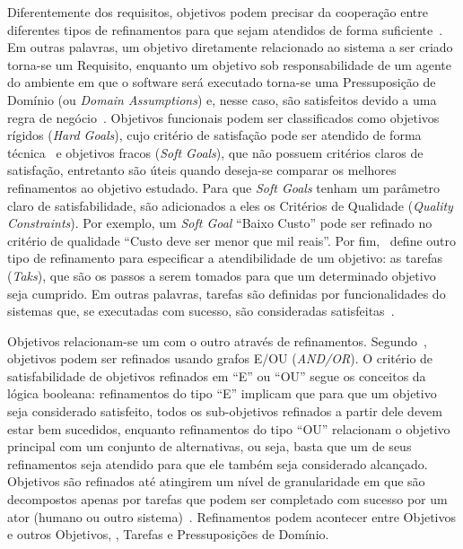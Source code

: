 Diferentemente dos requisitos, objetivos podem precisar da cooperação entre diferentes tipos de refinamentos para que sejam atendidos de forma suficiente~\cite{dardenne1993goal}. Em outras palavras, um objetivo diretamente relacionado ao sistema a ser criado torna-se um Requisito, enquanto um objetivo sob responsabilidade de um agente do ambiente em que o software será executado torna-se uma Pressuposição de Domínio (ou \textit{Domain Assumptions}) e, nesse caso, são satisfeitos devido a uma regra de negócio~\cite{van2001goal, van1998managing}. Objetivos funcionais podem ser classificados como objetivos rígidos (\textit{Hard Goals}), cujo critério de satisfação pode ser atendido de forma técnica~\cite{dardenne1993goal} e objetivos fracos (\textit{Soft Goals}), que não possuem critérios claros de satisfação, entretanto são úteis quando deseja-se comparar os melhores refinamentos ao objetivo estudado. Para que \textit{Soft Goals} tenham um parâmetro claro de satisfabilidade, são adicionados a eles os Critérios de Qualidade (\textit{Quality Constraints}). Por exemplo, um \textit{Soft Goal} ``Baixo Custo'' pode ser refinado no critério de qualidade ``Custo deve ser menor que mil reais''. Por fim,~\cite{jureta2008revisiting} define outro tipo de refinamento para especificar a atendibilidade de um objetivo: as tarefas (\textit{Taks}), que são os passos a serem tomados para que um determinado objetivo seja cumprido. Em outras palavras, tarefas são definidas por funcionalidades do sistemas que, se executadas com sucesso, são consideradas satisfeitas~\cite{souza2012requirement}.

Objetivos relacionam-se um com o outro através de refinamentos. Segundo~\cite{dardenne1991goal, dardenne1993goal}, objetivos podem ser refinados usando grafos E/OU (\textit{AND/OR}). O critério de satisfabilidade de objetivos refinados em ``E'' ou ``OU'' segue os conceitos da lógica booleana: refinamentos do tipo ``E'' implicam que para que um objetivo seja considerado satisfeito, todos os sub-objetivos refinados a partir dele devem estar bem sucedidos, enquanto refinamentos do tipo ``OU'' relacionam o objetivo principal com um conjunto de alternativas, ou seja, basta que um de seus refinamentos seja atendido para que ele também seja considerado alcançado. Objetivos são refinados até atingirem um nível de granularidade em que são decompostos apenas por tarefas que podem ser completado com sucesso por um ator (humano ou outro sistema)~\cite{souza2013awareness}. Refinamentos podem acontecer entre Objetivos e outros Objetivos, \sofgoals, Tarefas e Pressuposições de Domínio.

